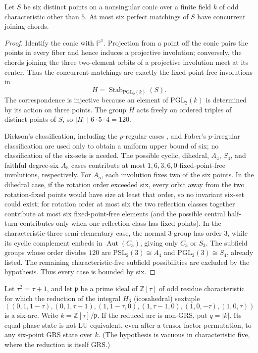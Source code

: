 \begin{lemma}\label{lem:conic-matchings}
Let \(S\) be six distinct points on a nonsingular conic over a finite
field \(k\) of odd characteristic other than \(5\).  At most six perfect
matchings of \(S\) have concurrent joining chords.
\end{lemma}

\begin{proof}
Identify the conic with \(\mathbb P^1\).  Projection from a point off the
conic pairs the points in every fiber and hence induces a projective
involution; conversely, the chords joining the three two-element orbits
of a projective involution meet at its center.  Thus the concurrent
matchings are exactly the fixed-point-free involutions in
\[
 H=\operatorname{Stab}_{\mathrm{PGL}_2(k)}(S).
\]
The correspondence is injective because an element of
\(\mathrm{PGL}_2(k)\) is determined by its action on three points.
The group \(H\) acts freely on ordered triples of distinct points of
\(S\), so \(\lvert H\rvert\mid6\cdot5\cdot4=120\).

Dickson's classification, including the \(p\)-regular cases
\cite[\S\S239--261]{Dickson1901}, and Faber's \(p\)-irregular
classification \cite[Theorem~1.1]{Faber2023} are used only to obtain a
uniform upper bound of six; no classification of the six-sets is needed.
The possible cyclic, dihedral, \(A_4\), \(S_4\), and faithful degree-six
\(A_5\) cases contribute at most \(1,6,3,6,0\) fixed-point-free
involutions, respectively.  For \(A_5\), each involution fixes two of the
six points.  In the dihedral case, if the rotation order exceeded six, every orbit away
from the two rotation-fixed points would have size at least that order,
so no invariant six-set could exist; for rotation order at most six the
two reflection classes together contribute at most six fixed-point-free
elements (and the possible central half-turn contributes only when one
reflection class has fixed points).  In
the characteristic-three semi-elementary case, the normal \(3\)-group
has order \(3\), while its cyclic complement embeds in
\(\operatorname{Aut}(C_3)\), giving only \(C_3\) or \(S_3\).
The subfield groups whose order divides \(120\) are
\(\mathrm{PSL}_2(3)\cong A_4\) and
\(\mathrm{PGL}_2(3)\cong S_4\), already listed.  The remaining
characteristic-five subfield possibilities are excluded by the
hypothesis.  Thus every case is bounded by six.
\end{proof}

\begin{theorem}\label{thm:lu-h3-grs}
Let \(\tau^2=\tau+1\), and let \(\mathfrak p\) be a prime ideal of
\(\mathbb Z[\tau]\) of odd residue characteristic for which the reduction
of the integral \(H_3\) (icosahedral) sextuple
\[
((0,1,1-\tau),(0,1,\tau-1),(1,1-\tau,0),(1,\tau-1,0),
 (1,0,-\tau),(1,0,\tau))
\]
is a six-arc.  Write \(k=\mathbb Z[\tau]/\mathfrak p\).  If the reduced
arc is non-GRS, put \(q=\lvert k\rvert\).  Its
equal-phase state is not LU-equivalent, even after a tensor-factor permutation, to
any six-point GRS state over \(k\).  (The hypothesis is vacuous in
characteristic five, where the reduction is itself GRS.)
\end{theorem}


